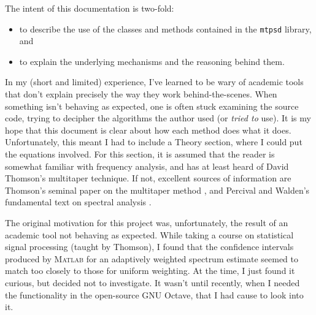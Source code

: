 The intent of this documentation is two-fold:
\begin{itemize}
    \item to describe the use of the classes and methods contained in the 
        \texttt{mtpsd} library, and
    \item to explain the underlying mechanisms and the reasoning behind them.
\end{itemize}
In my (short and limited) experience, I've learned to be wary of academic tools
that don't explain precisely the way they work behind-the-scenes.  When 
something isn't behaving as expected, one is often stuck examining the source 
code, trying to decipher the algorithms the author used (or \emph{tried to} 
use).  It is my hope that this document is clear about how each method does 
what it does.  Unfortunately, this meant I had to include a Theory section, 
where I could put the equations involved.  For this section, it is assumed 
that the reader is somewhat familiar with frequency analysis, and has at least 
heard of David Thomson's multitaper technique.  If not, excellent sources of 
information are Thomson's seminal paper on the multitaper method 
\cite{thomson:multitaper}, and Percival and Walden's fundamental text on 
spectral analysis \cite{percival:multitaper}.

The original motivation for this project was, unfortunately, the result of an 
academic tool not behaving as expected.  While taking a course on statistical 
signal processing (taught by Thomson), I found that the confidence intervals 
produced by \textsc{Matlab} for an adaptively weighted spectrum estimate seemed
to match too closely to those for uniform weighting.  At the time, I just found
it curious, but decided not to investigate.  It wasn't until recently, when I 
needed the functionality in the open-source GNU Octave, that I had cause to 
look into it.


